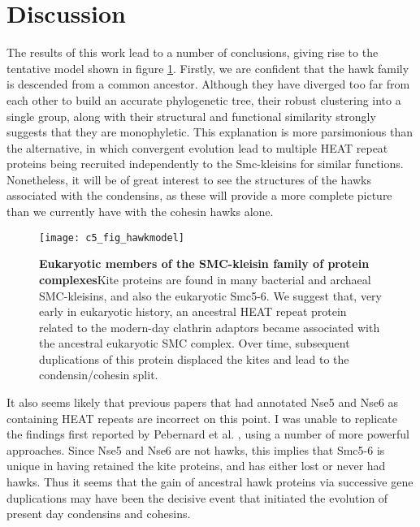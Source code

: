 \documentclass[a4paper,11pt,twoside,openright]{scrbook}
\begin{document}
\clearpage

\section{Discussion}

The results of this work lead to a number of conclusions, giving rise to the tentative model shown in figure \ref{figure:hawkmodel}. Firstly, we are confident that the hawk family is descended from a common ancestor. Although they have diverged too far from each other to build an accurate phylogenetic tree, their robust clustering into a single group, along with their structural and functional similarity strongly suggests that they are monophyletic. This explanation is more parsimonious than the alternative, in which convergent evolution lead to multiple HEAT repeat proteins being recruited independently to the Smc-kleisins for similar functions. Nonetheless, it will be of great interest to see the structures of the hawks associated with the condensins, as these will provide a more complete picture than we currently have with the cohesin hawks alone.

\begin{figure}[h]
\fcapsideright
    {\caption[Eukaryotic members of the SMC-kleisin family of protein complexes]{\sffamily\textbf{Eukaryotic members of the SMC-kleisin family of protein complexes}\newline \small Kite proteins are found in many bacterial and archaeal SMC-kleisins, and also the eukaryotic Smc5-6. We suggest that, very early in eukaryotic history, an ancestral HEAT repeat protein related to the modern-day clathrin adaptors became associated with the ancestral eukaryotic SMC complex. Over time, subsequent duplications of this protein displaced the kites and lead to the condensin/cohesin split.}\label{figure:hawkmodel}}
    {\texttt{[image: c5\_fig\_hawkmodel]}}
\end{figure}

It also seems  likely that previous papers that had annotated Nse5 and Nse6 as containing HEAT repeats are incorrect on this point. I was unable to replicate the findings first reported by Pebernard et al. \cite{Pebernard2006}, using a number of more powerful approaches. Since Nse5 and Nse6 are not hawks, this implies that Smc5-6 is unique in having retained the kite proteins, and has either lost or never had hawks. Thus it seems that the gain of ancestral hawk proteins via successive gene duplications may have been the decisive event that initiated the evolution of present day condensins and cohesins.
\end{document}
